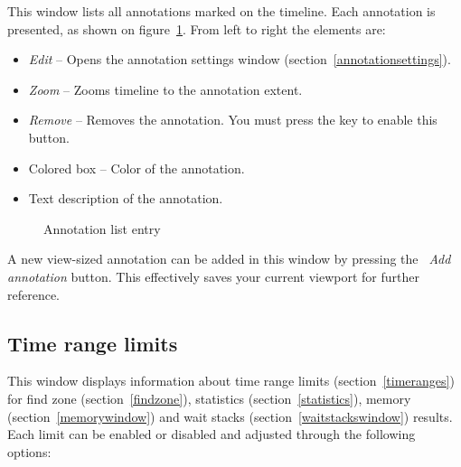 \documentclass[hidelinks,titlepage,a4paper,twoside]{article}
\begin{document}
This window lists all annotations marked on the timeline. Each annotation is presented, as shown on figure~\ref{figannlist}. From left to right the elements are:

\begin{itemize}
\item \emph{\faEdit{} Edit} -- Opens the annotation settings window (section~\ref{annotationsettings}).
\item \emph{\faMicroscope{} Zoom} -- Zooms timeline to the annotation extent.
\item \emph{\faTrash*{} Remove} -- Removes the annotation. You must press the \keys{\ctrl} key to enable this button.
\item Colored box -- Color of the annotation.
\item Text description of the annotation.
\end{itemize}

\begin{figure}[h]
\centering{}
\caption{Annotation list entry}
\label{figannlist}
\end{figure}

A new view-sized annotation can be added in this window by pressing the \emph{\faPlus{}~Add annotation} button. This effectively saves your current viewport for further reference.

\subsection{Time range limits}
\label{timerangelimits}

This window displays information about time range limits (section~\ref{timeranges}) for find zone (section~\ref{findzone}), statistics (section~\ref{statistics}), memory (section~\ref{memorywindow}) and wait stacks (section~\ref{waitstackswindow}) results. Each limit can be enabled or disabled and adjusted through the following options:
\end{document}
